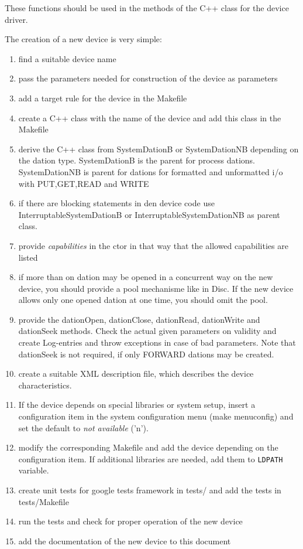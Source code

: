 These functions should be used in the methods of the C++ class 
for the device driver.


The creation of a new device is very simple:
\begin{enumerate}
\item find a suitable device name
\item pass the parameters needed for construction of the device as
      parameters
\item add a target rule for the device in the Makefile
\item create a C++ class with the name of the device and add this class
      in the Makefile
\item derive the C++ class from SystemDationB or SystemDationNB depending
      on the dation type. SystemDationB is the parent for process dations.
      SystemDationNB is parent for dations for formatted and unformatted
      i/o with PUT,GET,READ and WRITE
\item if there are blocking statements in den device code use 
      InterruptableSystemDationB or InterruptableSystemDationNB as
      parent class.
\item provide {\em capabilities} in the ctor in that way that the allowed
      capabilities are listed
\item if more than on dation may be opened in a concurrent way on the new
      device, you should provide a pool mechanisme like in Disc.
      If the new device allows only one opened dation at one time, you 
      should omit the pool.
\item provide the dationOpen, dationClose, dationRead, dationWrite 
      and dationSeek methods. Check the actual given parameters on
      validity and create Log-entries and throw exceptions in case
      of bad parameters.
      Note that dationSeek is not required, if only FORWARD dations
      may be created.
\item create a suitable XML description file, which describes the
      device characteristics.
\item If the device depends on special libraries or 
      system setup, insert a configuration item  
      in the system configuration menu (make menuconfig)
      and set the default to {\em not available} ('n').
\item modify the corresponding Makefile and add the device depending on
      the configuration item. If additional libraries are needed,
      add them to \texttt{LDPATH} variable. 
\item create unit tests for google tests framework in tests/ and add the
      tests in tests/Makefile
\item run the tests and check for proper operation of the new device
\item add the documentation of the new device to this document
\end{enumerate}

